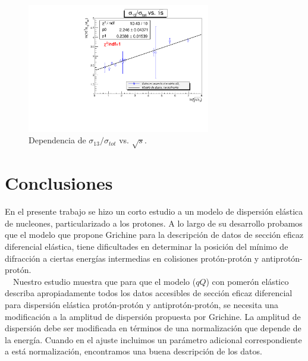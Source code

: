 \vskip -0.5cm
\begin{figure}[H]\centering
\includegraphics[width=8cm]{graficas/grafsigma.pdf}
\caption{Dependencia de $\sigma_{13}/\sigma_{tot}$ vs. $\sqrt{s}$.}
\label{lafig_sigma}
\end{figure} 
\section{Conclusiones}
En el presente trabajo se hizo un corto estudio a un modelo de dispersión
elástica de nucleones, particularizado a los protones. A lo largo de su desarrollo probamos que el modelo que propone Grichine para la descripción de datos de sección eficaz diferencial elástica, tiene dificultades  en determinar la posición del mínimo de difracción a ciertas energías intermedias en colisiones protón-protón y antiprot\'on-prot\'on.\\

\ \ Nuestro estudio muestra que para que  el modelo ($qQ$) con pomerón elástico describa apropiadamente todos los datos accesibles de sección eficaz diferencial para dispersión elástica prot\'on-prot\'on y antiprot\'on-prot\'on, se necesita una modificación a la amplitud de dispersión propuesta por Grichine. La amplitud de dispersión debe ser modificada en términos de una normalización que depende de la energía. Cuando en el ajuste incluimos un parámetro adicional correspondiente a est\'a normalización, encontramos una buena descripción de los datos.
